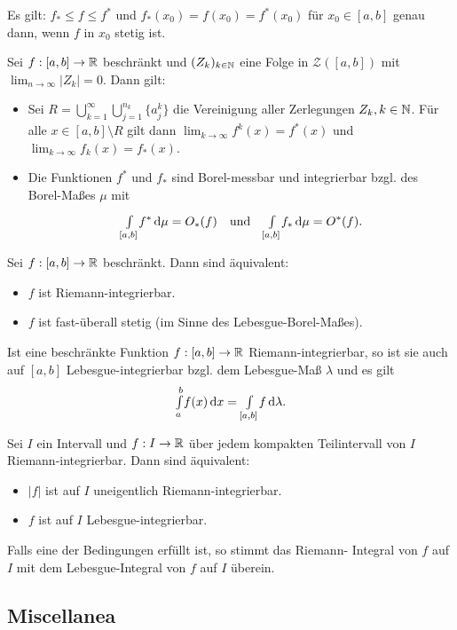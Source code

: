 \documentclass{cheat-sheet}
\begin{document}
\begin{bem}
  Es gilt: $f_* \leq f \leq f^*$ und $f_*(x_0) = f(x_0) = f^*(x_0)$ für $x_0 \in [a, b]$ genau dann, wenn $f$ in $x_0$ stetig ist.
\end{bem}

\begin{satz}
  Sei $f : [a, b] \to \mathbb{R}$ beschränkt und $(Z_k)_{k \in \mathbb{N}}$ eine Folge in $\mathcal{Z}([a, b])$ mit $\lim_{n \to \infty} \left|Z_k\right| = 0$. Dann gilt:
  \begin{itemize}
    \item Sei $R = \bigcup_{k=1}^\infty \bigcup_{j=1}^{n_k} \{ a_j^k \}$ die Vereinigung aller Zerlegungen $Z_k, k \in \mathbb{N}$. Für alle $x \in [a, b] \setminus R$ gilt dann $\lim_{k \to \infty} f^k(x) = f^*(x)$ und $\lim_{k \to \infty} f_k(x) = f_*(x)$.
    \item Die Funktionen $f^*$ und $f_*$ sind Borel-messbar und integrierbar bzgl. des Borel-Maßes $\mu$ mit
    \[ {\textstyle \int\limits_{[a, b]}^{}} f^* \,\mathrm{d} \mu = O_*(f) \quad \text{und} \quad {\textstyle \int\limits_{[a, b]}^{}} f_* \,\mathrm{d} \mu = O^*(f). \]
  \end{itemize}
\end{satz}

\begin{satz}
  Sei $f : [a, b] \to \mathbb{R}$ beschränkt. Dann sind äquivalent:
  \begin{itemize}
    \item $f$ ist Riemann-integrierbar.
    \item $f$ ist fast-überall stetig (im Sinne des Lebesgue-Borel-Maßes).
  \end{itemize}
\end{satz}

\begin{satz}
  Ist eine beschränkte Funktion $f : [a, b] \to \mathbb{R}$ Riemann-integrierbar, so ist sie auch auf $[a, b]$ Lebesgue-integrierbar bzgl. dem Lebesgue-Maß $\lambda$ und es gilt
  \[ {\textstyle \int\limits_{a}^{b}} f(x) \,\mathrm{d} x = {\textstyle \int\limits_{[a, b]}^{}} f \,\mathrm{d} \lambda. \]
\end{satz}

\begin{samepage}
\begin{satz}
  Sei $I$ ein Intervall und $f : I \to \mathbb{R}$ über jedem kompakten Teilintervall von $I$ Riemann-integrierbar. Dann sind äquivalent:
  \begin{itemize}
    \item $\left|f\right|$ ist auf $I$ uneigentlich Riemann-integrierbar.
    \item $f$ ist auf $I$ Lebesgue-integrierbar.
  \end{itemize}
  Falls eine der Bedingungen erfüllt ist, so stimmt das Riemann- Integral von $f$ auf $I$ mit dem Lebesgue-Integral von $f$ auf $I$ überein.
\end{satz}


\subsection{Miscellanea}
\end{samepage}
\end{document}
